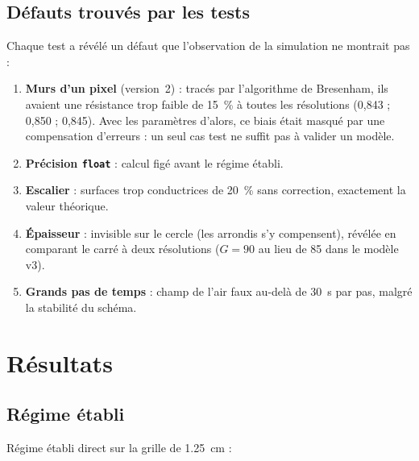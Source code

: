 \documentclass[11pt,a4paper]{article}
\theoremstyle{definition}
\theoremstyle{remark}
\begin{document}
\subsection{Défauts trouvés par les tests}\label{sec-defauts}

Chaque test a révélé un défaut que l'observation de la simulation ne montrait pas :
\begin{enumerate}
  \item \textbf{Murs d'un pixel} (version~2) : tracés par l'algorithme de Bresenham,
  ils avaient une résistance trop faible de \qty{15}{\percent} à toutes les
  résolutions (0,843 ; 0,850 ; 0,845). Avec les paramètres d'alors, ce biais était
  masqué par une compensation d'erreurs : un seul cas test ne suffit pas à valider un
  modèle.
  \item \textbf{Précision \texttt{float}} : calcul figé avant le régime établi.
  \item \textbf{Escalier} : surfaces trop conductrices de \qty{20}{\percent} sans
  correction, exactement la valeur théorique.
  \item \textbf{Épaisseur} : invisible sur le cercle (les arrondis s'y compensent),
  révélée en comparant le carré à deux résolutions ($G = 90$ au lieu de 85 dans le
  modèle v3).
  \item \textbf{Grands pas de temps} : champ de l'air faux au-delà de
  \qty{30}{\second} par pas, malgré la stabilité du schéma.
\end{enumerate}

\section{Résultats}\label{sec-resultats}

\subsection{Régime établi}

Régime établi direct sur la grille de \qty{1,25}{\centi\metre} :
\end{document}
